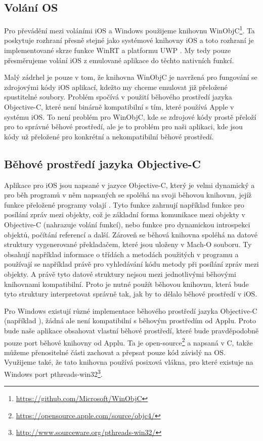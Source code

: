 \documentclass[12pt]{article}
\newcommand{\Rplus}{\protect\hspace{-.1em}\protect\raisebox{.35ex}{\smaller{\smaller\textbf{+}}}}
\newcommand{\Cpp}{\mbox{C\Rplus\Rplus}\xspace}
\begin{document}
\subsection*{Volání OS}
\label{sec:winobjc}

Pro převádění mezi voláními iOS a Windows použijeme knihovnu WinObjC\footnote{\url{https://github.com/Microsoft/WinObjC}}.
Ta poskytuje rozhraní přesně stejné jako systémové knihovny iOS a toto rozhraní je implementované skrze funkce WinRT a platformu UWP \cite{winobjc}.
My tedy pouze přesměrujeme volání iOS z emulované aplikace do těchto nativních funkcí.

Malý zádrhel je pouze v tom, že knihovna WinObjC je navržená pro fungování se zdrojovými kódy iOS aplikací, kdežto my chceme emulovat již přeložené spustitelné soubory.
Problém spočívá v použití běhového prostředí jazyka Objective-C, které není binárně kompatibilní s tím, které používá Apple v systému iOS.
To není problém pro WinObjC, kde se zdrojové kódy prostě přeloží pro to správné běhové prostředí, ale je to problém pro naši aplikaci, kde jsou kódy už přeložené pro konkrétní a nekompatibilní běhové prostředí.

\subsection*{Běhové prostředí jazyka Objective-C}

Aplikace pro iOS jsou napsané v jazyce Objective-C, který je velmi dynamický a pro běh programů v něm napsaných se spoléhá na svoji běhovou knihovnu, jejíž funkce přeložené programy volají \cite{objc, understandingObjc, objcDecompiler}.
Tyto funkce zahrnují například funkce pro posílání zpráv mezi objekty, což je základní forma komunikace mezi objekty v Objective-C (nahrazuje volání funkcí), nebo funkce pro dynamickou introspekci objektů, počítání referencí a další.
Zároveň se běhová knihovna spoléhá na datové struktury vygenerované překladačem, které jsou uloženy v Mach-O souboru.
Ty obsahují například informace o třídách a metodách použitých v programu a používají se například právě pro vyhledávání kódu metody při posílání zpráv mezi objekty.
A právě tyto datové struktury nejsou mezi jednotlivými běhovými knihovnami kompatibilní.
Proto je nutné použít běhovou knihovnu, která bude tyto struktury interpretovat správně tak, jak by to dělalo běhové prostředí v iOS.

Pro Windows existují různé implementace běhového prostředí jazyka Objective-C (například \cite{modernObjc, modularObjc, gnustep}), žádná ale není kompatibilní s běhovým prostředím od Applu.
Proto bude naše aplikace obsahovat vlastní běhové prostředí, které bude pravděpodobně pouze port běhové knihovny od Applu.
Ta je open-source\footnote{\url{https://opensource.apple.com/source/objc4/}} a napsaná v \Cpp, takže můžeme přenositelné části zachovat a přepsat pouze kód závislý na OS.
Využijeme také, že tato knihovna používá posixová vlákna, pro které existuje na Windows port pthreads-win32\footnote{\url{http://www.sourceware.org/pthreads-win32/}}.



\end{document}
